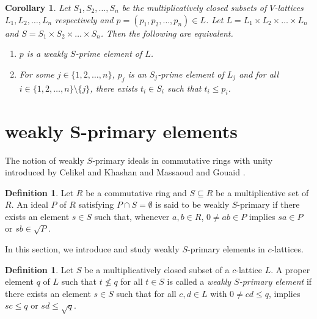 \documentclass[10pt,twoside,a4paper]{amsart}
\numberwithin{equation}{section}
\theoremstyle{plain}
\newtheorem{cor}[lem]{Corollary}
\theoremstyle{definition}
\newtheorem{defn}[lem]{Definition}
\newtheorem{definition}[lem]{Definition}
\begin{document}
\begin{cor}%
	Let $S_1, S_2, \dots , S_n$ be the multiplicatively closed subsets of $V$-lattices $L_1, L_2, \dots , L_n$ respectively and $p=(p_1,p_2,\dots,p_n)\in L$. Let $L=L_1\times L_2\times \dots \times L_n$ and $S=S_1\times S_2\times \dots \times S_n$. Then the following are equivalent.
	\begin{enumerate}
		\item%
		$p$ is a weakly $S$-prime element of $L$.
		\item%
		For some $j\in \{1,2,\dots,n\}$, $p_j$ is an $S_j$-prime element of $L_j$ and for all $i\in \{1,2,\dots,n\}\setminus \{j\}$, there exists $t_i\in S_i$ such that $t_i\leq p_i$.
	\end{enumerate}
\end{cor}




	\section{weakly S-primary elements}
	The notion of weakly $S$‑primary ideals in commutative rings with unity introduced by Celikel and Khashan \cite{CK} and Massaoud and Gouaid \cite{MG}.
	
	\begin{defn} 
		Let $R$ be a commutative ring and $S\subseteq R$ be a multiplicative set of $R$. An ideal $P$ of $R$ satisfying $P \cap S =\emptyset$ is said to be weakly $S$-primary if there exists an element $s\in S$ such that, whenever $a, b\in R$, $0\neq ab\in P$ implies $sa\in P$ or $sb\in \sqrt{P}$.
	\end{defn}	
	
	In this section, we introduce and study weakly $S$-primary elements in $c$-lattices.
	
	\begin{definition}
		Let $S$ be a multiplicatively closed subset of a $c$-lattice $L$. A proper element $q$ of $L$ such that $t\nleq q$ for all $t\in S$ is called a  \textit{weakly $S$-primary element} if there exists an element $s\in S$ such that for all $c,d \in L$ with $0 \neq cd\leq q$, implies $sc \leq q$ or $sd \leq \sqrt q$.	
	\end{definition}
	
\end{document}
